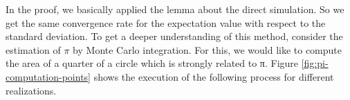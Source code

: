 \documentclass{stdlocal}
\begin{document}
    In the proof, we basically applied the lemma about the direct simulation.
    So we get the same convergence rate for the expectation value with respect to the standard deviation.
    To get a deeper understanding of this method, consider the estimation of $π$ by Monte Carlo integration.
    For this, we would like to compute the area of a quarter of a circle which is strongly related to π.
    Figure \ref{fig:pi-computation-points} shows the execution of the following process for different realizations.
\end{document}
